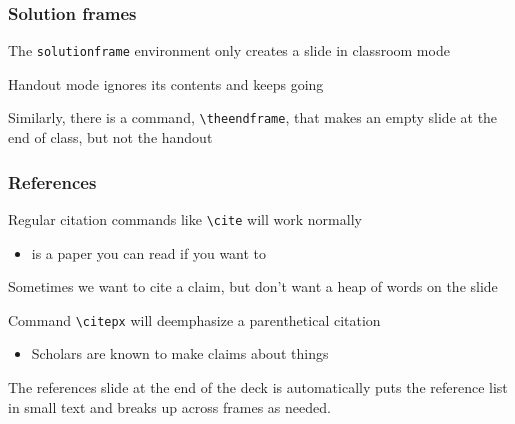 \documentclass[aspectratio=169,handout]{beamer}
\begin{document}
\begin{solutionframe}
	\frametitle{Solution frames}
	\begin{witem}
		\item The \texttt{solutionframe} environment only creates a slide
			in classroom mode
		\item Handout mode ignores its contents and keeps going
		\item Similarly, there is a command, \texttt{\textbackslash{}theendframe},
			that makes an empty slide at the end of class, but not the handout
	\end{witem}
\end{solutionframe}



\begin{frame}
	\frametitle{References}
	\begin{witem}
		\item Regular citation commands like \texttt{\textbackslash{}cite} will work normally
			\begin{itemize}
				\item \cite{DuquetteJMP} is a paper you can read if you want to
			\end{itemize}
		\item Sometimes we want to cite a claim, but don't want a heap of words on the slide
		\item Command \texttt{\textbackslash{}citepx} will deemphasize a parenthetical citation
			\begin{itemize}
				\item Scholars are known to make claims about things 
			\end{itemize}
		\item The references slide at the end of the deck is automatically puts the reference list
			in small text and breaks up across frames as needed.
	\end{witem}
\end{frame}
\end{document}
